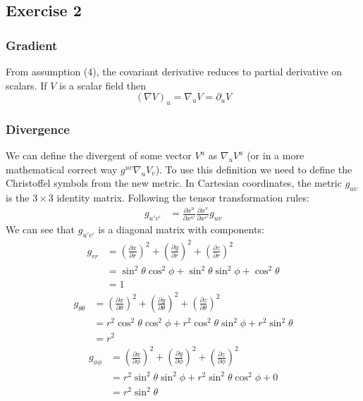 \subsection{Exercise 2}
\subsubsection{Gradient}
From assumption (4), the covariant derivative reduces to partial derivative on scalars. If $V$ is a scalar field then
\begin{equation}
    (\nabla V)_u = \nabla_u V = \partial_u V
\end{equation}
\subsubsection{Divergence}
We can define the divergent of some vector $V^u$ as $\nabla_u V^u$ (or in a more mathematical correct way $g^{uv}\nabla_u V_v$). To use this definition we need to define the Christoffel symbols from the new metric. In Cartesian coordinates, the metric $g_{uv}$ is the $3\times3$ identity matrix. Following the tensor transformation rules:
\begin{align}
    g_{u'v'} &= \frac{\partial x^u}{\partial x^{u'}} \frac{\partial x^v}{\partial x^{v'}} g_{uv}
\end{align}
We can see that $g_{u'v'}$ is a diagonal matrix with components:
\begin{align}
    g_{rr} &= \left(\frac{\partial x}{\partial r}\right)^2 + \left(\frac{\partial y}{\partial r}\right)^2 + \left(\frac{\partial z}{\partial r}\right)^2 \\
     &= \sin^2\theta \cos^2\phi + \sin^2\theta \sin^2 \phi + \cos^2\theta \\
     &= 1
\end{align}
\begin{align}
    g_{\theta\theta} &= \left(\frac{\partial x}{\partial \theta}\right)^2 + \left(\frac{\partial y}{\partial \theta}\right)^2 + \left(\frac{\partial z}{\partial \theta}\right)^2 \\
    &= r^2 \cos^2\theta \cos^2\phi + r^2\cos^2\theta\sin^2\phi+r^2\sin^2\theta \\
    &= r^2
\end{align}
\begin{align}
    g_{\phi\phi} &= \left(\frac{\partial x}{\partial \phi}\right)^2 + \left(\frac{\partial y}{\partial \phi}\right)^2 + \left(\frac{\partial z}{\partial \phi}\right)^2 \\
    &= r^2 \sin^2\theta \sin^2\phi +r^2 \sin^2\theta \cos^2\phi + 0 \\
    &= r^2 \sin^2\theta
\end{align}
